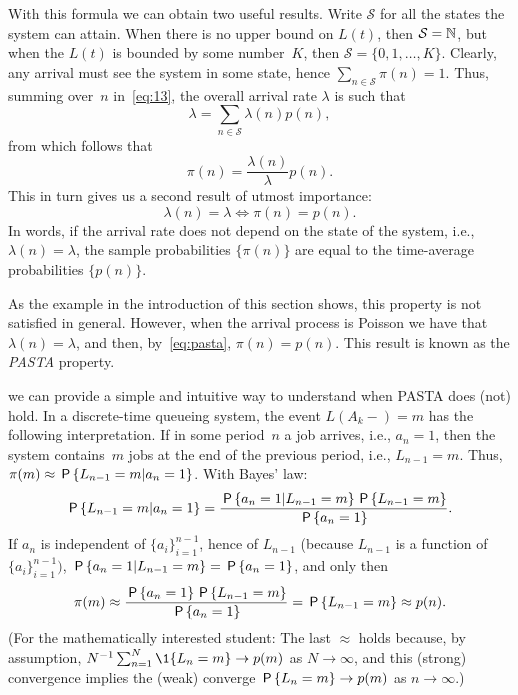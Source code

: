 \documentclass[queueing-book.tex]{subfiles}
\begin{document}
With this formula we can obtain two useful results.
Write $\mathcal{S}$ for all the states the system can attain.
When there is no upper bound on $L(t)$, then $\mathcal{S} = \N$, but when the $L(t)$ is bounded by some number~$K$, then $\mathcal{S} = \{0, 1, \ldots, K\}$.
Clearly, any arrival must see the system in some state, hence $\sum_{n\in \mathcal{S}} \pi(n) = 1$.
Thus, summing over~$n$ in~\cref{eq:13}, the overall arrival rate $\lambda$ is such that
\begin{equation}
\label{eq:lc-1}
\lambda = \sum_{n\in \mathcal{S}} \lambda(n)p(n),
\end{equation}
from which follows that
\begin{equation*}
\pi(n) = \frac{\lambda(n)}{\lambda} p(n).
\end{equation*}
This in turn gives us a second  result of utmost importance:
\begin{equation}\label{eq:pasta}
 \lambda(n) = \lambda \iff \pi(n) = p(n).
\end{equation}
In words, if the arrival rate does not depend on the state of the system, i.e., $\lambda(n)=\lambda$, the sample probabilities $\{\pi(n)\}$ are equal to the time-average probabilities $\{p(n)\}$.

As the example in the introduction of this section shows, this property is not satisfied in general.
However, when the arrival process is Poisson we have that $\lambda(n)=\lambda$, and then, by~\cref{eq:pasta}, $\pi(n)=p(n)$. This result is known as the \emph{PASTA} property.


  we can provide a simple and intuitive way to understand when PASTA does (not) hold.
In a discrete-time queueing system, the event ${L(A_k-)=m}$ has the following interpretation.
If in some period~$n$ a job arrives, i.e., $a_{n}=1$, then the system contains~$m$ jobs at the end of the previous period, i.e., $L_{n-1}=m$.
Thus, $\pi(m) \approx \P{L_{n-1}=m | a_n=1}$.
With Bayes' law:
\begin{equation*}
\P{L_{n-1}=m | a_n=1} = \frac{\P{a_n=1|L_{n-1}=m} \P{L_{n-1}=m}}{\P{a_n=1}}.
\end{equation*}
If $a_{n}$ is independent of $\{a_i\}_{i=1}^{n-1}$, hence of $L_{n-1}$ (because $L_{n-1}$ is a function of $\{a_i\}_{i=1}^{n-1})$, $\P{a_n=1|L_{n-1}=m} = \P{a_n=1}$, and only then
\begin{equation*}
\pi(m) \approx \frac{\P{a_n=1} \P{L_{n-1}=m}}{\P{a_n=1}} = \P{L_{n-1}=m} \approx p(n).
\end{equation*}
(For the mathematically interested student: The last $\approx$ holds because, by assumption, $N^{-1}\sum_{n=1}^N \1{L_n=m} \to p(m)$ as $N\to\infty$, and this (strong) convergence implies the (weak) converge $\P{L_n=m} \to p(m)$ as $n \to \infty$.)
\end{document}
